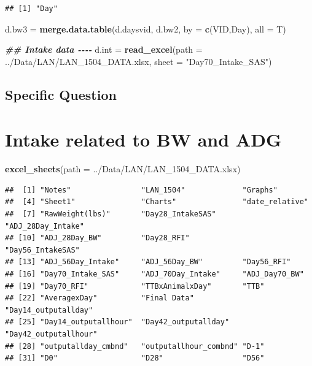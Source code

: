 \documentclass[
]{book}
\newenvironment{Shaded}{\begin{snugshade}}{\end{snugshade}}
\newcommand{\AttributeTok}[1]{\textcolor[rgb]{0.13,0.29,0.53}{#1}}
\newcommand{\DocumentationTok}[1]{\textcolor[rgb]{0.56,0.35,0.01}{\textbf{\textit{#1}}}}
\newcommand{\FunctionTok}[1]{\textcolor[rgb]{0.13,0.29,0.53}{\textbf{#1}}}
\newcommand{\NormalTok}[1]{#1}
\newcommand{\OtherTok}[1]{\textcolor[rgb]{0.56,0.35,0.01}{#1}}
\newcommand{\StringTok}[1]{\textcolor[rgb]{0.31,0.60,0.02}{#1}}
\begin{document}
\begin{verbatim}
## [1] "Day"
\end{verbatim}

\begin{Shaded}
\begin{Highlighting}[]
\NormalTok{d.bw3 }\OtherTok{=} \FunctionTok{merge.data.table}\NormalTok{(d.daysvid, d.bw2, }\AttributeTok{by =} \FunctionTok{c}\NormalTok{(}\StringTok{\textquotesingle{}VID\textquotesingle{}}\NormalTok{,}\StringTok{\textquotesingle{}Day\textquotesingle{}}\NormalTok{), }\AttributeTok{all =}\NormalTok{ T)}

\DocumentationTok{\#\# Intake data {-}{-}{-}{-}}
\NormalTok{d.int }\OtherTok{=} \FunctionTok{read\_excel}\NormalTok{(}\AttributeTok{path =} \StringTok{\textquotesingle{}../Data/LAN/LAN\_1504\_DATA.xlsx\textquotesingle{}}\NormalTok{,}
                   \AttributeTok{sheet =} \StringTok{"Day70\_Intake\_SAS"}\NormalTok{)}
\end{Highlighting}
\end{Shaded}

\section{Specific Question}\label{specific-question}

\chapter{Intake related to BW and ADG}\label{intake-related-to-bw-and-adg}

\begin{Shaded}
\begin{Highlighting}[]
\FunctionTok{excel\_sheets}\NormalTok{(}\AttributeTok{path =} \StringTok{\textquotesingle{}../Data/LAN/LAN\_1504\_DATA.xlsx\textquotesingle{}}\NormalTok{)}
\end{Highlighting}
\end{Shaded}

\begin{verbatim}
##  [1] "Notes"                "LAN_1504"             "Graphs"              
##  [4] "Sheet1"               "Charts"               "date_relative"       
##  [7] "RawWeight(lbs)"       "Day28_IntakeSAS"      "ADJ_28Day_Intake"    
## [10] "ADJ_28Day_BW"         "Day28_RFI"            "Day56_IntakeSAS"     
## [13] "ADJ_56Day_Intake"     "ADJ_56Day_BW"         "Day56_RFI"           
## [16] "Day70_Intake_SAS"     "ADJ_70Day_Intake"     "ADJ_Day70_BW"        
## [19] "Day70_RFI"            "TTBxAnimalxDay"       "TTB"                 
## [22] "AveragexDay"          "Final Data"           "Day14_outputallday"  
## [25] "Day14_outputallhour"  "Day42_outputallday"   "Day42_outputallhour" 
## [28] "outputallday_cmbnd"   "outputallhour_combnd" "D-1"                 
## [31] "D0"                   "D28"                  "D56"
\end{verbatim}
\end{document}
